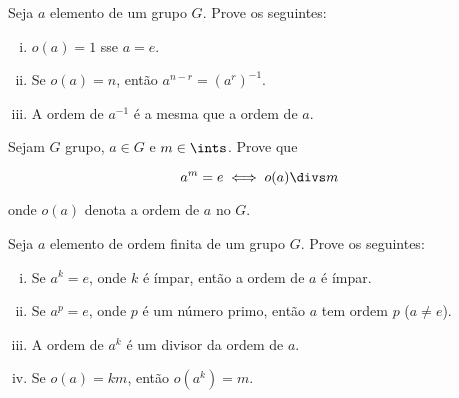 \begin{exercise}
    Seja $a$ elemento de um grupo $G$. Prove os seguintes:

\begin{enumerate}[(i)]
    \item $o(a) = 1$ sse $a = e$.
    \item Se $o(a) = n$, então $a^{n - r} = (a^r)^{-1}$.
    \item A ordem de $a^{-1}$ é a mesma que a ordem de $a$.
\end{enumerate}

\end{exercise}

\begin{exercise}
Sejam $G$ grupo, $a \in G$ e $m \in \ints$. Prove que

$$
    a^m = e \iff o(a) \divs m
$$

onde $o(a)$ denota a ordem de $a$ no $G$.
\end{exercise}

\begin{exercise}
Seja $a$ elemento de ordem finita de um grupo $G$. Prove os seguintes:

\begin{enumerate}[(i)]
    \item Se $a^k = e$, onde $k$ é ímpar, então a ordem de $a$ é ímpar.
    \item Se $a^p = e$, onde $p$ é um número primo, então $a$ tem ordem $p$ ($a \not = e$).
    \item A ordem de $a^k$ é um divisor da ordem de $a$.
    \item Se $o(a) = km$, então $o(a^k) = m$.
\end{enumerate}

\end{exercise}
